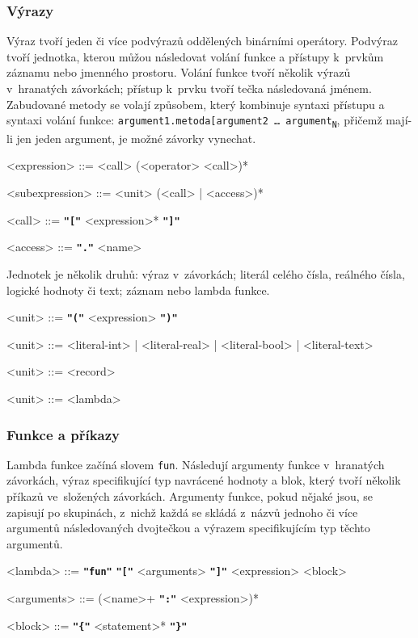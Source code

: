 \documentclass[a4paper,12pt]{article}
\def\quote #1{"#1"}
\def\emphasis #1{\textbf{\texttt{\quote{#1}}}}
\begin{document}
\subsubsection{Výrazy}
Výraz tvoří jeden či více podvýrazů oddělených binárními operátory. Podvýraz tvoří jednotka, kterou můžou následovat volání funkce a přístupy k~prvkům záznamu nebo jmenného prostoru. Volání funkce tvoří několik výrazů v~hranatých závorkách; přístup k~prvku tvoří tečka následovaná jménem. Zabudované metody se volají způsobem, který kombinuje syntaxi přístupu a syntaxi volání funkce: \texttt{argument1.metoda[argument2 \ldots{} argument\textsubscript{N}}, přičemž mají-li jen jeden argument, je možné závorky vynechat.
\begin{grammar}
<expression> ::= <call> (<operator> <call>)*

<subexpression> ::= <unit> (<call> | <access>)*

<call> ::= \emphasis{[} <expression>* \emphasis{]}

<access> ::= \emphasis{.} <name>
\end{grammar}

Jednotek je několik druhů: výraz v~závorkách; literál celého čísla, reálného čísla, logické hodnoty či text; záznam nebo lambda funkce.
\begin{grammar}
<unit> ::= \emphasis{(} <expression> \emphasis{)}

<unit> ::= <literal-int> | <literal-real> | <literal-bool> | <literal-text>

<unit> ::= <record>

<unit> ::= <lambda>
\end{grammar}

\subsubsection{Funkce a příkazy}
Lambda funkce začíná slovem \texttt{fun}. Následují argumenty funkce v~hranatých závorkách, výraz specifikující typ navrácené hodnoty a blok, který tvoří několik příkazů ve~složených závorkách. Argumenty funkce, pokud nějaké jsou, se zapisují po skupinách, z~nichž každá se skládá z~názvů jednoho či více argumentů následovaných dvojtečkou a výrazem specifikujícím typ těchto argumentů.
\begin{grammar}
<lambda> ::= \emphasis{fun} \emphasis{[} <arguments> \emphasis{]} <expression> <block>

<arguments> ::= (<name>+ \emphasis{:} <expression>)*

<block> ::= \emphasis{\{} <statement>* \emphasis{\}}
\end{grammar}
\end{document}
